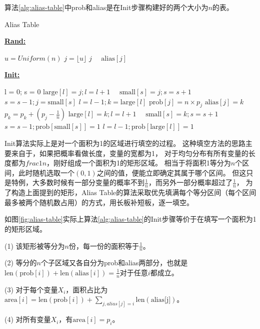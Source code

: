 算法\ref{alg:alias-table}中prob和alias是在Init步骤构建好的两个大小为$n$的表。

\begin{algorithm}[htb]  
\caption{Alias Table} 
\label{alg:alias-table}
\textbf{\underline{Rand:}}
\begin{algorithmic}[1] 
\State $u = Uniform(n)$
\State $j = \lfloor u \rfloor$
\Return $j$
\Else
~~\Return $\mbox{alias}[j]$
\EndIf
\end{algorithmic}  
\textbf{\underline{Init:}}
\begin{algorithmic}[1] 
\State l = 0; s = 0
$\mbox{large}[l] = j; l = l + 1$
\Else
~~$\mbox{small}[s] = j; s = s + 1$
\EndIf
\EndFor
{}
\State $s = s - 1; j = \mbox{small}[s]$
\State $l = l - 1; k = \mbox{large}[l]$
\State $\mbox{prob}[j] = n \times p_j$
\State $\mbox{alias}[j] = k$
\State $p_k = p_k + (p_j - \frac{1}{n})$
$\mbox{large}[l] = k; l = l + 1$
\Else
~~$\mbox{small}[s] = k; s = s + 1$
\EndIf
\EndWhile
{}
$s = s - 1; \mbox{prob}[\mbox{small}[s]] = 1$
\EndWhile
{}
$l = l - 1; \mbox{prob}[\mbox{large}[l]] = 1$ \EndWhile
\end{algorithmic}  
\end{algorithm}  

Init算法实际上是对一个面积为1的区域进行填空的过程。
这种填空方法的思路主要来自于，如果把概率看做长度，变量的宽都为1，
对于均匀分布有所有变量的长度都为$frac{1}{n}$，刚好组成一个面积为1的矩形区域。
相当于将面积1等分为$n$个区间，此时随机选取一个$(0, 1)$之间的值，便能立即确定其属于哪个区间。
但这只是特例，大多数时候有一部分变量的概率不到$\frac{1}{n}$，而另外一部分概率超过了$\frac{1}{n}$，
为了构造上面提到的矩形，Alias Table的算法采取优先填满每个等分区间（每个区间最多被两个随机数占用）的方式，用长板补短板，逐一填空。

如图\ref{fig:alias-table}实际上算法\ref{alg:alias-table}的Init步骤等价于在填写一个面积为1的矩形区域。

(1) 该矩形被等分为$n$份，每一份的面积等于$\frac{1}{n}$。

(2) 等分的$n$个子区域又各自分为prob和alias两部分，也就是$\mbox{len}(\mbox{prob}[i]) +\mbox{len}( \mbox{alias}[i]) = \frac{1}{n}$对于任意$i$都成立。

(3) 对于每个变量$X_i$，面积占比为$\mbox{area}[i] = \mbox{len}(\mbox{prob}[i]) + \sum_{j, alias[j]=i}{\mbox{len}(\mbox{alias[j]})}$。

(4) 对所有变量$X_i$，有$\mbox{area}[i] = p_i$。

